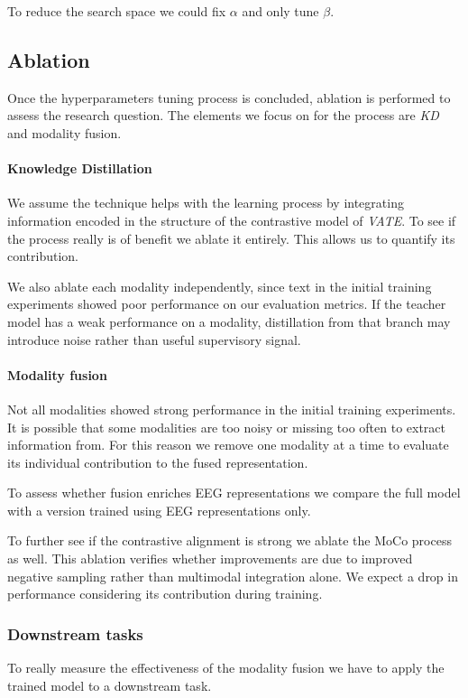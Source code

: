 To reduce the search space we could fix $\alpha$ and only tune $\beta$.

\subsection{Ablation}
Once the hyperparameters tuning process is concluded, ablation is performed to assess the research question.
The elements we focus on for the process are \textit{KD} and modality fusion.

\paragraph{Knowledge Distillation} We assume the technique helps with the learning process by integrating information
encoded in the structure of the contrastive model of \textit{VATE}.
To see if the process really is of benefit we ablate it entirely.
This allows us to quantify its contribution.

We also ablate each modality independently, since text in the initial training experiments showed poor performance on our evaluation metrics.
If the teacher model has a weak performance on a modality, distillation from that branch may introduce noise rather than useful supervisory signal.

\paragraph{Modality fusion} Not all modalities showed strong performance in the initial training experiments.
It is possible that some modalities are too noisy or missing too often to extract information from.
For this reason we remove one modality at a time to evaluate its individual contribution to the fused representation.

To assess whether fusion enriches EEG representations we compare the full model with a version trained using EEG representations only.

To further see if the contrastive alignment is strong we ablate the MoCo process as well.
This ablation verifies whether improvements are due to improved negative sampling rather than multimodal integration alone.
We expect a drop in performance considering its contribution during training.

\subsubsection{Downstream tasks}
To really measure the effectiveness of the modality fusion we have to apply the trained model to a downstream task.

